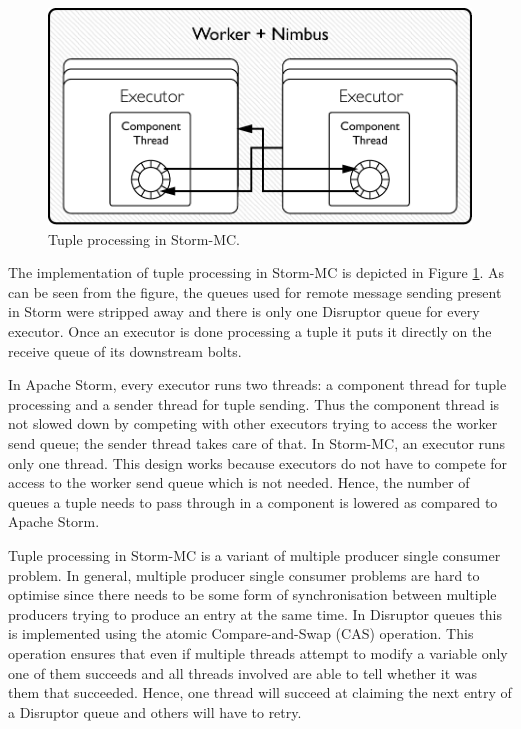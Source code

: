 \begin{figure}[!htb]
	\centering
	\includegraphics[scale=0.7]{pdf/worker_inside_mc.pdf}
	\caption{Tuple processing in Storm-MC.}
	\label{fig:worker_inside_mc}
\end{figure}

The implementation of tuple processing in Storm-MC is depicted in Figure \ref{fig:worker_inside_mc}. As can be seen from the figure, the queues used for remote message sending present in Storm were stripped away and there is only one Disruptor queue for every executor. Once an executor is done processing a tuple it puts it directly on the receive queue of its downstream bolts.

In Apache Storm, every executor runs two threads: a component thread for tuple processing and a sender thread for tuple sending. Thus the component thread is not slowed down by competing with other executors trying to access the worker send queue; the sender thread takes care of that. In Storm-MC, an executor runs only one thread. This design works because executors do not have to compete for access to the worker send queue which is not needed. Hence, the number of queues a tuple needs to pass through in a component is lowered as compared to Apache Storm.

Tuple processing in Storm-MC is a variant of multiple producer single consumer problem. In general, multiple producer single consumer problems are hard to optimise since there needs to be some form of synchronisation between multiple producers trying to produce an entry at the same time. In Disruptor queues this is implemented using the atomic Compare-and-Swap (CAS) operation. This operation ensures that even if multiple threads attempt to modify a variable only one of them succeeds and all threads involved are able to tell whether it was them that succeeded. Hence, one thread will succeed at claiming the next entry of a Disruptor queue and others will have to retry.

